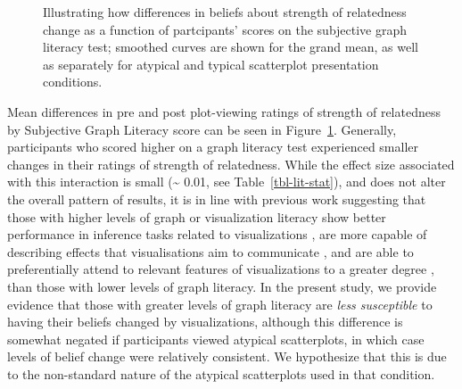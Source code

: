 \documentclass[manuscript,screen,review]{acmart}
\begin{document}
\begin{figure}


\caption{\label{fig-lit-smooth}Illustrating how differences in beliefs
about strength of relatedness change as a function of partcipants'
scores on the subjective graph literacy test; smoothed curves are shown
for the grand mean, as well as separately for atypical and typical
scatterplot presentation conditions.}

\end{figure}%

Mean differences in pre and post plot-viewing ratings of strength of
relatedness by Subjective Graph Literacy score can be seen in
Figure~\ref{fig-lit-smooth}. Generally, participants who scored higher
on a graph literacy test experienced smaller changes in their ratings of
strength of relatedness. While the effect size associated with this
interaction is small (\textasciitilde{} 0.01, see
Table~\ref{tbl-lit-stat}), and does not alter the overall pattern of
results, it is in line with previous work suggesting that those with
higher levels of graph or visualization literacy show better performance
in inference tasks related to visualizations \citep{canham_2010}, are
more capable of describing effects that visualisations aim to
communicate \citep{shah_2011}, and are able to preferentially attend to
relevant features of visualizations to a greater degree
\citep{okan_2015}, than those with lower levels of graph literacy. In
the present study, we provide evidence that those with greater levels of
graph literacy are \emph{less susceptible} to having their beliefs
changed by visualizations, although this difference is somewhat negated
if participants viewed atypical scatterplots, in which case levels of
belief change were relatively consistent. We hypothesize that this is
due to the non-standard nature of the atypical scatterplots used in that
condition.
\end{document}
